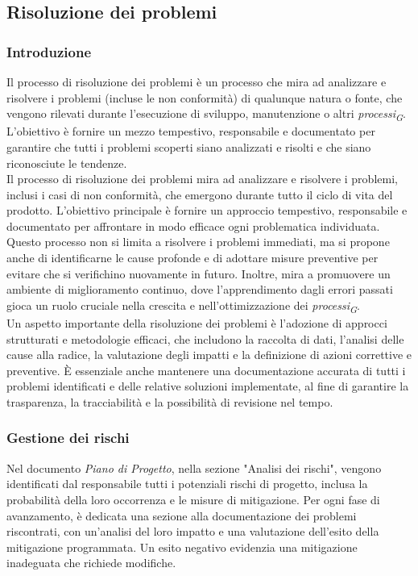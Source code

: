 \subsection{Risoluzione dei problemi}

\subsubsection{Introduzione}
Il processo di risoluzione dei problemi è un processo che mira ad analizzare e risolvere i problemi (incluse le non conformità) di qualunque natura o fonte, che vengono rilevati durante l'esecuzione di sviluppo, manutenzione o altri \textit{processi}\textsubscript{\textit{G}}. \\
L'obiettivo è fornire un mezzo tempestivo, responsabile e documentato per garantire che tutti i problemi scoperti siano analizzati e risolti e che siano riconosciute le tendenze. \\
Il processo di risoluzione dei problemi mira ad analizzare e risolvere i problemi, inclusi i casi di non conformità, che emergono durante tutto il ciclo di vita del prodotto. L'obiettivo principale è fornire un approccio tempestivo, responsabile e documentato per affrontare in modo efficace ogni problematica individuata. \\
Questo processo non si limita a risolvere i problemi immediati, ma si propone anche di identificarne le cause profonde e di adottare misure preventive per evitare che si verifichino nuovamente in futuro. Inoltre, mira a promuovere un ambiente di miglioramento continuo, dove l'apprendimento dagli errori passati gioca un ruolo cruciale nella crescita e nell'ottimizzazione dei \textit{processi}\textsubscript{\textit{G}}. \\
Un aspetto importante della risoluzione dei problemi è l'adozione di approcci strutturati e metodologie efficaci, che includono la raccolta di dati, l'analisi delle cause alla radice, la valutazione degli impatti e la definizione di azioni correttive e preventive. È essenziale anche mantenere una documentazione accurata di tutti i problemi identificati e delle relative soluzioni implementate, al fine di garantire la trasparenza, la tracciabilità e la possibilità di revisione nel tempo.

\subsubsection{Gestione dei rischi}
Nel documento \textit{Piano di Progetto}, nella sezione "Analisi dei rischi", vengono identificati dal responsabile tutti i potenziali rischi di progetto, inclusa la probabilità della loro occorrenza e le misure di mitigazione. Per ogni fase di avanzamento, è dedicata una sezione alla documentazione dei problemi riscontrati, con un'analisi del loro impatto e una valutazione dell'esito della mitigazione programmata. Un esito negativo evidenzia una mitigazione inadeguata che richiede modifiche.

